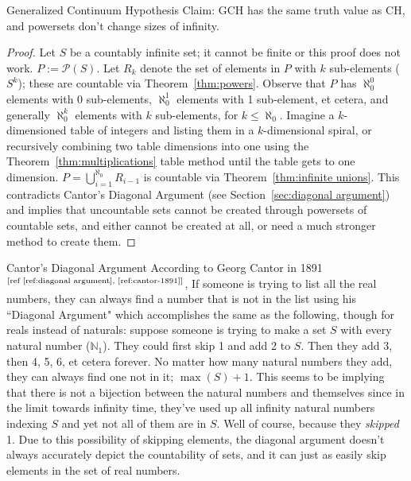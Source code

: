 \documentclass[12pt]{article}
\begin{document}
\begin{section}{Generalized Continuum Hypothesis}\label{sec:GCH}
	Claim: GCH has the same truth value as CH, and powersets don't change sizes of infinity.
	\begin{proof}
		Let $S$ be a countably infinite set; it cannot be finite or this proof does not work.
		$P :=\mathcal P(S)$. Let $R_k$ denote the set of elements in $P$ with $k$ sub-elements
		($S^k$); these are countable via Theorem~\ref{thm:powers}. Observe that $P$ has
		$\aleph_0^0$ elements with 0 sub-elements, $\aleph_0^1$ elements with 1 sub-element, et
		cetera, and generally $\aleph_0^k$ elements with $k$ sub-elements, for
		$k\leqslant \aleph_0$. Imagine a $k$-dimensioned table of integers and listing them in
		a $k$-dimensional spiral, or recursively combining two table dimensions into one using
		the Theorem~\ref{thm:multiplications} table method until the table gets to one dimension.
		$\displaystyle P=\bigcup_{i=1}^{\aleph_0}R_{i-1}$ is countable via
		Theorem~\ref{thm:infinite unions}. This contradicts Cantor's Diagonal Argument (see
		Section~\ref{sec:diagonal argument}) and implies that uncountable sets cannot be created
		through powersets of countable sets, and either cannot be created at all, or need a much
		stronger method to create them.
	\end{proof}
\end{section}

\begin{section}{Cantor's Diagonal Argument}\label{sec:diagonal argument}
	According to Georg Cantor in 1891$^\text{[ref \ref{ref:diagonal argument},
	\ref{ref:cantor-1891}]}$, If someone is trying to list all the real numbers, they can
	always find a number that is not in the list using his ``Diagonal Argument" which
	accomplishes the same as the following, though for reals instead of
	naturals: suppose someone is trying to make a set $S$ with every natural number
	($\mathbb N_1$). They could first skip 1 and add 2 to $S$. Then they add 3, then 4, 5, 6,
	et cetera forever. No matter how many natural numbers they add, they can always find one
	not in it; $\max(S)+1$. This seems to be implying that there is not a bijection between the
	natural numbers and themselves since in the limit towards infinity time, they've used up all
	infinity natural numbers indexing $S$ and yet not all of them are in $S$. Well of course, because
	they \emph{skipped} 1. Due to this possibility of skipping elements, the diagonal argument doesn't always accurately depict
	the countability of sets, and it can just as easily skip elements in the set of real numbers.
\end{section}
\end{document}
